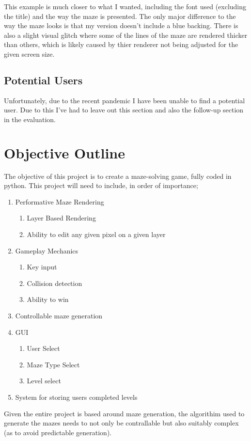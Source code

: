 \documentclass{article}
\begin{document}
\begin{minipage}{0.5\textwidth}\raggedright
This example is much closer to what I wanted, including the font used (excluding the title) and the way the maze is presented. The only major difference to the way
the maze looks is that my version doesn't include a blue backing. There is also a slight visual glitch where some of the lines of the maze are rendered thicker than others,
which is likely caused by thier renderer not being adjusted for the given screen size.
\end{minipage}
\linebreak

\subsection{Potential Users}
Unfortunately, due to the recent pandemic I have been unable to find a potential user. Due to this I've had to leave out this section and also the follow-up section
in the evaluation.

\section{Objective Outline}
The objective of this project is to create a maze-solving game, fully coded in python. This project will need to include, in order of importance; 
\begin{enumerate}
	\item Performative Maze Rendering
	\begin{enumerate}
		\item Layer Based Rendering
		\item Ability to edit any given pixel on a given layer
	\end{enumerate}
	\item Gameplay Mechanics
	\begin{enumerate}
		\item Key input
		\item Collision detection
		\item Ability to win
	\end{enumerate}
	\item Controllable maze generation
	\item GUI
	\begin{enumerate}
		\item User Select
		\item Maze Type Select
		\item Level select
	\end{enumerate}
	\item System for storing users completed levels
\end{enumerate}
Given the entire project is based around maze generation, the algorithim used to generate the mazes needs to not only be contrallable
but also suitably complex (as to avoid predictable generation).
\end{document}
